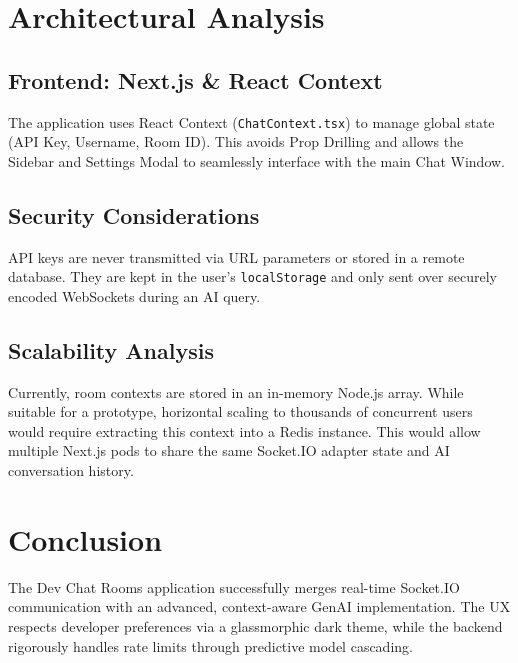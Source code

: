 \documentclass[12pt, a4paper]{article}
\begin{document}
\newpage
\section{Architectural Analysis}
\subsection{Frontend: Next.js \& React Context}
The application uses React Context (\texttt{ChatContext.tsx}) to manage global state (API Key, Username, Room ID). This avoids Prop Drilling and allows the Sidebar and Settings Modal to seamlessly interface with the main Chat Window. 

\subsection{Security Considerations}
API keys are never transmitted via URL parameters or stored in a remote database. They are kept in the user's \texttt{localStorage} and only sent over securely encoded WebSockets during an AI query.

\subsection{Scalability Analysis}
Currently, room contexts are stored in an in-memory Node.js array. While suitable for a prototype, horizontal scaling to thousands of concurrent users would require extracting this context into a Redis instance. This would allow multiple Next.js pods to share the same Socket.IO adapter state and AI conversation history.

\section{Conclusion}
The Dev Chat Rooms application successfully merges real-time Socket.IO communication with an advanced, context-aware GenAI implementation. The UX respects developer preferences via a glassmorphic dark theme, while the backend rigorously handles rate limits through predictive model cascading.
\end{document}
